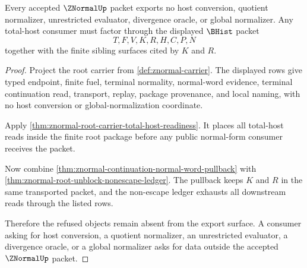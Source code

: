 \begin{theorem}
\label{thm:znormal-total-host-refusal-exhaustion}
Every accepted $\ZNormalUp$ packet exports no host conversion, quotient normalizer, unrestricted evaluator, divergence oracle, or global normalizer. Any total-host consumer must factor through the displayed $\BHist$ packet
$$
T,F,V,K,R,H,C,P,N
$$
together with the finite sibling surfaces cited by $K$ and $R$.
\end{theorem}
\begin{proof}
Project the root carrier from \autoref{def:znormal-carrier}. The displayed rows give typed endpoint, finite fuel, terminal normality, normal-word evidence, terminal continuation read, transport, replay, package provenance, and local naming, with no host conversion or global-normalization coordinate.

Apply \autoref{thm:znormal-root-carrier-total-host-readiness}. It places all total-host reads inside the finite root package before any public normal-form consumer receives the packet.

Now combine \autoref{thm:znormal-continuation-normal-word-pullback} with \autoref{thm:znormal-root-unblock-nonescape-ledger}. The pullback keeps $K$ and $R$ in the same transported packet, and the non-escape ledger exhausts all downstream reads through the listed rows.

Therefore the refused objects remain absent from the export surface. A consumer asking for host conversion, a quotient normalizer, an unrestricted evaluator, a divergence oracle, or a global normalizer asks for data outside the accepted $\ZNormalUp$ packet.
\end{proof}

